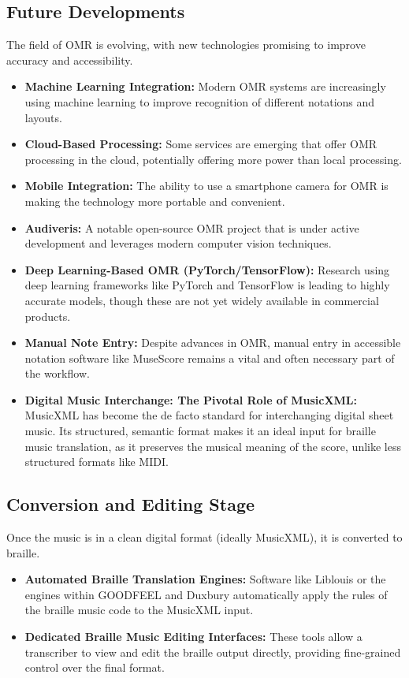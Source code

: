 \subsection{Future Developments}\label{ch10:ssec:omr-future-developments}
The field of \gls{OMR} is evolving, with new technologies promising to improve accuracy and accessibility.
\begin{itemize}
	\item \textbf{Machine Learning Integration:} Modern \gls{OMR} systems are increasingly using machine learning to improve recognition of different notations and layouts.
	\item \textbf{Cloud-Based Processing:} Some services are emerging that offer \gls{OMR} processing in the cloud, potentially offering more power than local processing.
	\item \textbf{Mobile Integration:} The ability to use a smartphone camera for \gls{OMR} is making the technology more portable and convenient.
	\item \textbf{Audiveris:} A notable open-source \gls{OMR} project that is under active development and leverages modern computer vision techniques.
	\item \textbf{Deep Learning-Based OMR (PyTorch/TensorFlow):} Research using deep learning frameworks like PyTorch and TensorFlow is leading to highly accurate models, though these are not yet widely available in commercial products.
	\item \textbf{Manual Note Entry:} Despite advances in \gls{OMR}, manual entry in accessible notation software like MuseScore remains a vital and often necessary part of the workflow.
	\item \textbf{Digital Music Interchange: The Pivotal Role of MusicXML:} \gls{MusicXML} has become the de facto standard for interchanging digital sheet music. Its structured, semantic format makes it an ideal input for braille music translation, as it preserves the musical meaning of the score, unlike less structured formats like MIDI.
\end{itemize}

\subsection{Conversion and Editing Stage}\label{ch10:ssec:conversion-editing-stage}
Once the music is in a clean digital format (ideally \gls{MusicXML}), it is converted to braille.
\begin{itemize}
	\item \textbf{Automated Braille Translation Engines:} Software like Liblouis or the engines within GOODFEEL and Duxbury automatically apply the rules of the braille music code to the \gls{MusicXML} input.
	\item \textbf{Dedicated Braille Music Editing Interfaces:} These tools allow a transcriber to view and edit the braille output directly, providing fine-grained control over the final format.
\end{itemize}

